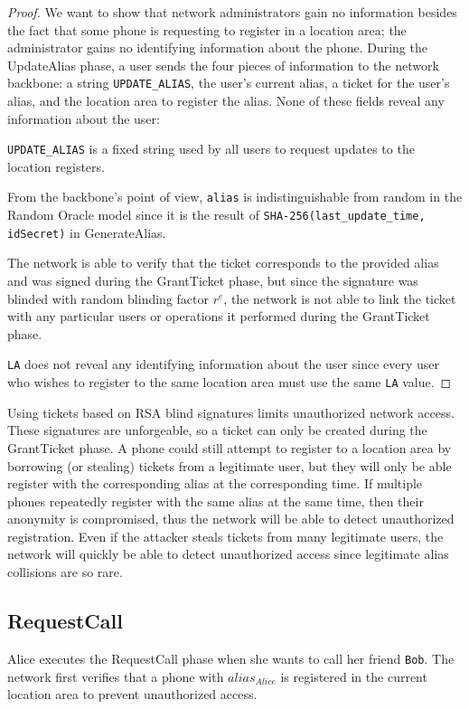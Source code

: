 \documentclass[11pt]{article}
\begin{document}
\begin{proof}
	We want to show that network administrators gain no information besides the fact that some phone is requesting to register in a location area; the administrator gains no identifying information about the phone. During the UpdateAlias phase, a user sends the four pieces of information to the network backbone: a string \texttt{UPDATE_ALIAS}, the user's current alias, a ticket for the user's alias, and the location area to register the alias. None of these fields reveal any information about the user:

\texttt{UPDATE_ALIAS} is a fixed string used by all users to request updates to the location registers.

From the backbone's point of view, \texttt{alias} is indistinguishable from random in the Random Oracle model since it is the result of \texttt{SHA-256(last_update_time, idSecret)} in GenerateAlias.

The network is able to verify that the ticket corresponds to the provided alias and was signed during the GrantTicket phase, but since the signature was blinded with random blinding factor $r^e$, the network is not able to link the ticket with any particular users or operations it performed during the GrantTicket phase.

\texttt{LA} does not reveal any identifying information about the user since every user who wishes to register to the same location area must use the same \texttt{LA} value.
\end{proof}

Using tickets based on RSA blind signatures limits unauthorized network access. These signatures are unforgeable, so a ticket can only be created during the GrantTicket phase. A phone could still attempt to register to a location area by borrowing (or stealing) tickets from a legitimate user, but they will only be able register with the corresponding alias at the corresponding time. If multiple phones repeatedly register with the same alias at the same time, then their anonymity is compromised, thus the network will be able to detect unauthorized registration. Even if the attacker steals tickets from many legitimate users, the network will quickly be able to detect unauthorized access since legitimate alias collisions are so rare.

\subsection{RequestCall}
Alice executes the RequestCall phase when she wants to call her friend \texttt{Bob}. The network first verifies that a phone with $alias_{Alice}$ is registered in the current location area to prevent unauthorized access.
\end{document}
